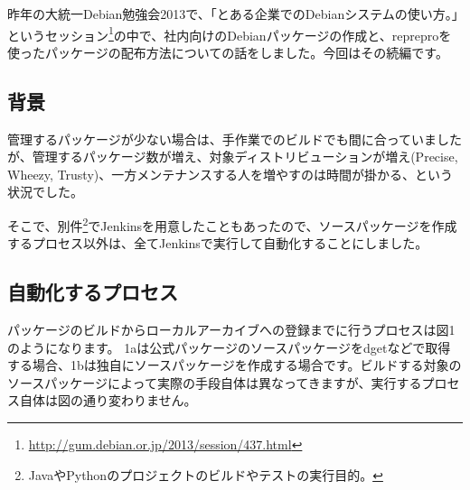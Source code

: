 \documentclass[mingoth,a4paper]{jsarticle}
\begin{document}

昨年の大統一Debian勉強会2013で、「とある企業でのDebianシステムの使い方。」というセッション\footnote{\url{http://gum.debian.or.jp/2013/session/437.html}}の中で、社内向けのDebianパッケージの作成と、repreproを使ったパッケージの配布方法についての話をしました。今回はその続編です。

\subsection{背景}

管理するパッケージが少ない場合は、手作業でのビルドでも間に合っていましたが、管理するパッケージ数が増え、対象ディストリビューションが増え(Precise, Wheezy, Trusty)、一方メンテナンスする人を増やすのは時間が掛かる、という状況でした。

そこで、別件\footnote{JavaやPythonのプロジェクトのビルドやテストの実行目的。}でJenkinsを用意したこともあったので、ソースパッケージを作成するプロセス以外は、全てJenkinsで実行して自動化することにしました。

\subsection{自動化するプロセス}

パッケージのビルドからローカルアーカイブへの登録までに行うプロセスは図1のようになります。
1aは公式パッケージのソースパッケージをdgetなどで取得する場合、1bは独自にソースパッケージを作成する場合です。ビルドする対象のソースパッケージによって実際の手段自体は異なってきますが、実行するプロセス自体は図の通り変わりません。
\end{document}
